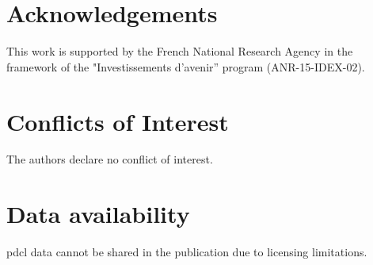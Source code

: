 \section{Acknowledgements}
This work is supported by the French National Research Agency in the framework of the "Investissements d’avenir” program (ANR-15-IDEX-02).

\section{Conflicts of Interest}
The authors declare no conflict of interest.

\section{Data availability}
\acrshort{pdcl} data cannot be shared in the publication due to licensing limitations. 
